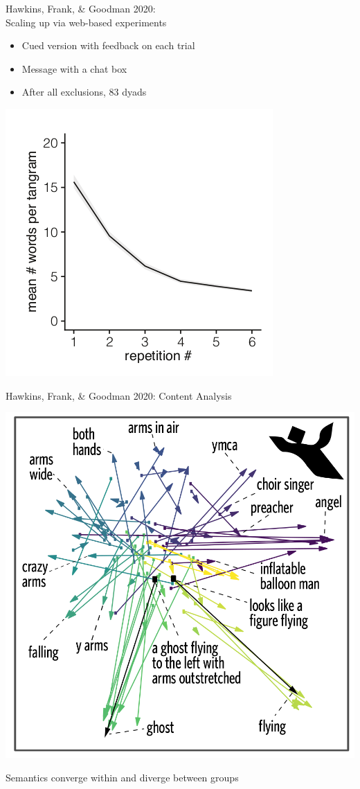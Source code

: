 \documentclass[ 12pt, xcolor=beamer,table,usenames,dvipsnames, ignorenonframetext, ngerman]{beamer}
\begin{document}
%
\begin{frame}{\large Hawkins, Frank, \& Goodman 2020: \\Scaling up via web-based experiments }
\begin{itemize}
	\item Cued version with feedback on each trial 
	\item Message with a chat box 
	\item After all exclusions, 83 dyads 
\end{itemize}
\begin{center}
\includegraphics[width=.5\textwidth]{../images/hawkins_fewer_words_square.png}
\end{center}
\end{frame}
%


\begin{frame}{\large Hawkins, Frank, \& Goodman 2020: Content Analysis}
	\begin{center}
	\includegraphics[width=.6\textwidth]{../images/hawkins_semantics.png}
	\end{center}
	Semantics converge within and diverge between groups
\end{frame}
\end{document}
